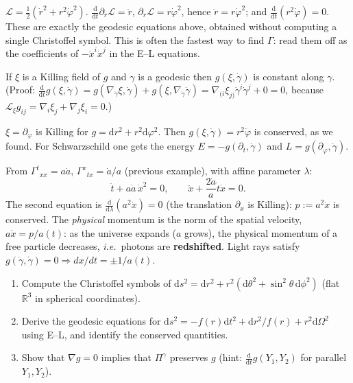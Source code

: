 \documentclass[11pt,a4paper]{article}
\numberwithin{equation}{section}
\theoremstyle{definition}
\theoremstyle{plain}
\newcommand{\R}{\mathbb{R}}
\newcommand{\dd}{\mathrm{d}}
\newcommand{\Lie}{\mathcal{L}}
\newcommand{\ie}{\emph{i.e.}\ }
\begin{document}
\begin{example}
$\mathcal L=\tfrac12(\dot r^2+r^2\dot\varphi^2)$. $\frac{\dd}{\dd t}\partial_{\dot r}\mathcal L=\ddot r$, $\partial_r\mathcal L=r\dot\varphi^2$, hence $\ddot r=r\dot\varphi^2$; and $\frac{\dd}{\dd t}(r^2\dot\varphi)=0$. These are exactly the geodesic equations above, obtained without computing a single Christoffel symbol. This is often the fastest way to find $\Gamma$: read them off as the coefficients of $-\dot x^i\dot x^j$ in the E--L equations.
\end{example}

\begin{formal}
If $\xi$ is a Killing field of $g$ and $\gamma$ is a geodesic then $g(\xi,\dot\gamma)$ is constant along $\gamma$. (Proof: $\frac{\dd}{\dd t}g(\xi,\dot\gamma)=g(\nabla_{\dot\gamma}\xi,\dot\gamma)+g(\xi,\nabla_{\dot\gamma}\dot\gamma)=\nabla_{(i}\xi_{j)}\dot\gamma^i\dot\gamma^j+0=0$, because $\Lie_\xi g_{ij}=\nabla_i\xi_j+\nabla_j\xi_i=0$.)
\end{formal}
\begin{example}
$\xi=\partial_\varphi$ is Killing for $g=\dd r^2+r^2\dd\varphi^2$. Then $g(\xi,\dot\gamma)=r^2\dot\varphi$ is conserved, as we found. For Schwarzschild one gets the energy $E=-g(\partial_t,\dot\gamma)$ and $L=g(\partial_\varphi,\dot\gamma)$.
\end{example}

\begin{example}
From $\Gamma^t{}_{xx}=a\dot a$, $\Gamma^x{}_{tx}=\dot a/a$ (previous example), with affine parameter $\lambda$:
\[
\ddot t+a\dot a\,\dot x^2=0,\qquad\ddot x+\frac{2\dot a}{a}\dot t\dot x=0 .
\]
The second equation is $\frac{\dd}{\dd\lambda}(a^2\dot x)=0$ (the translation $\partial_x$ is Killing): $p:=a^2\dot x$ is conserved. The \emph{physical} momentum is the norm of the spatial velocity, $a\dot x=p/a(t)$: as the universe expands ($a$ grows), the physical momentum of a free particle decreases, \ie photons are \textbf{redshifted}. Light rays satisfy $g(\dot\gamma,\dot\gamma)=0\Rightarrow dx/dt=\pm1/a(t)$.
\end{example}

\begin{exercises}
\begin{enumerate}[nosep]
\item Compute the Christoffel symbols of $\dd s^2=\dd r^2+r^2(\dd\theta^2+\sin^2\theta\,\dd\phi^2)$ (flat $\R^3$ in spherical coordinates).
\item Derive the geodesic equations for $\dd s^2=-f(r)\dd t^2+\dd r^2/f(r)+r^2\dd\Omega^2$ using E--L, and identify the conserved quantities.
\item Show that $\nabla g=0$ implies that $\Pi^\gamma$ preserves $g$ (hint: $\frac{\dd}{\dd t}g(Y_1,Y_2)$ for parallel $Y_1,Y_2$).
\end{enumerate}
\end{exercises}
\end{document}
